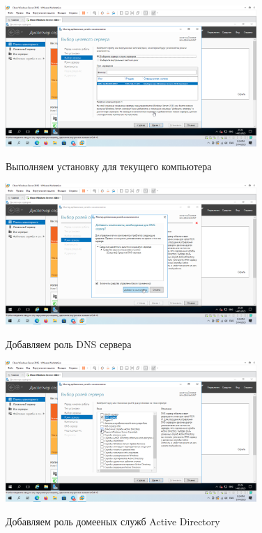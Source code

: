 \documentclass[a4paper]{article}
\begin{document}
  \begin{figure}[H]
    \centering
    \includegraphics[width=0.85\textwidth]{5_0031}
    \label{img:31}
    \caption{Выполняем установку для текущего компьютера}
  \end{figure}

  \begin{figure}[H]
    \centering
    \includegraphics[width=0.85\textwidth]{5_0032}
    \label{img:32}
    \caption{Добавляем роль DNS сервера}
  \end{figure}

  \begin{figure}[H]
    \centering
    \includegraphics[width=0.85\textwidth]{5_0033}
    \label{img:33}
    \caption{Добавляем роль домееных служб Active Directory}
  \end{figure}
\end{document}
